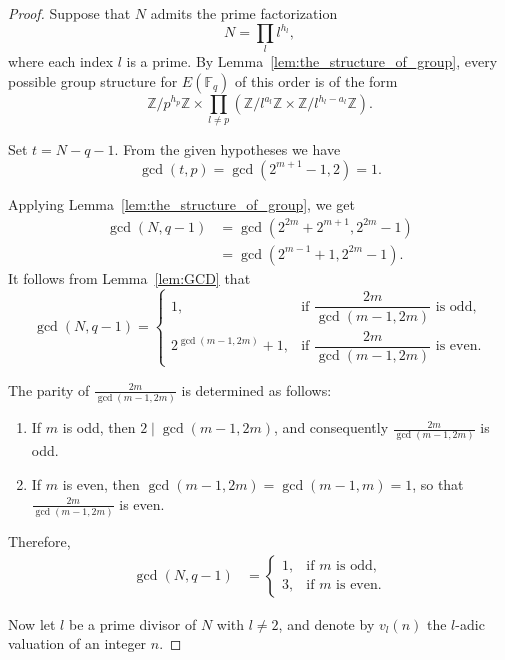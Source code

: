 \documentclass[journal,12pt,onecolumn]{IEEEtran}
\begin{document}
\begin{proof}
Suppose that $ N $ admits the prime factorization 
\[ N = \prod_{ l } l^{h_l} ,  \]
where each index $ l $ is a prime.
By Lemma~\ref{lem:the_structure_of_group}, every possible group structure for $E(\mathbb{F}_q)$ of this order is of the form
\[
\mathbb{Z} / p^{h_p} \mathbb{Z} \times \prod_{l \neq p} \left( \mathbb{Z} / l^{a_l} \mathbb{Z} \times \mathbb{Z} / l^{h_l - a_l} \mathbb{Z} \right).
\]

Set $t = N - q - 1$. From the given hypotheses we have
\[
\gcd(t, p) = \gcd(2^{m+1} - 1, 2) = 1.
\]

Applying Lemma~\ref{lem:the_structure_of_group}, we get
\begin{align*}
\gcd(N, q-1)
&= \gcd(2^{2m} + 2^{m+1}, 2^{2m} - 1) \\
&= \gcd(2^{m-1} + 1, 2^{2m} - 1) .
\end{align*}
It follows from Lemma~\ref{lem:GCD} that
\[\gcd(N, q-1) = \begin{cases}
1, & \text{if } \dfrac{2m}{\gcd(m-1, 2m)} \text{ is odd}, \\[6pt]
2^{\gcd(m-1, 2m)} + 1, & \text{if } \dfrac{2m}{\gcd(m-1, 2m)} \text{ is even}.
\end{cases}
\]

The parity of $\frac{2m}{\gcd(m-1, 2m)}$ is determined as follows:
\begin{enumerate}
    \item If $m$ is odd, then $2 \mid \gcd(m-1, 2m)$, and consequently $\frac{2m}{\gcd(m-1, 2m)}$ is odd.
    \item If $m$ is even, then $\gcd(m-1, 2m) = \gcd(m-1, m) = 1$, so that $\frac{2m}{\gcd(m-1, 2m)}$ is even.
\end{enumerate}
Therefore,
\begin{align*}
\gcd(N, q-1)
&=
\begin{cases}
1, & \text{if } m \text{ is odd}, \\
3, & \text{if } m \text{ is even}.
\end{cases}
\end{align*}

Now let $l$ be a prime divisor of $N$ with $l \neq 2$, and denote by $v_l(n)$ the $l$-adic valuation of an integer $n$.


\end{proof}
\end{document}
